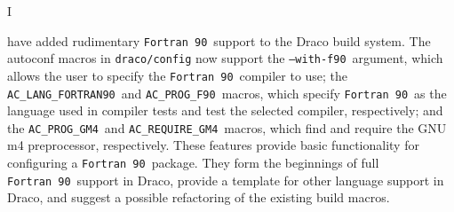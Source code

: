 \documentclass[11pt]{nmemo}
\newcommand{\fninety}{\texttt{Fortran~90}}
\newcommand{\withfninety}{\texttt{--with-f90}}
\newcommand{\langfninety}{\texttt{AC\_LANG\_FORTRAN90}}
\newcommand{\progfninety}{\texttt{AC\_PROG\_F90}}
\newcommand{\requiregmfour}{\texttt{AC\_REQUIRE\_GM4}}
\newcommand{\proggmfour}{\texttt{AC\_PROG\_GM4}}
\begin{document}

\subject{\fninety\ Build Support in Draco}
\date{\today}




\opening


I have added rudimentary \fninety\ support to the Draco build
system\cite{draco-build}.  The autoconf\cite{autoconf} macros in
\texttt{draco/config} now support the \withfninety\ argument, which
allows the user to specify the \fninety\ compiler to use; the
\langfninety\ and \progfninety\ macros, which specify \fninety\ as the
language used in compiler tests and test the selected compiler,
respectively; and the \proggmfour\ and \requiregmfour\ macros, which
find and require the GNU m4\cite{m4} preprocessor, respectively.
These features provide basic functionality for configuring a \fninety\
package.  They form the beginnings of full \fninety\ support in Draco,
provide a template for other language support in Draco, and suggest a
possible refactoring of the existing build macros.
\end{document}
